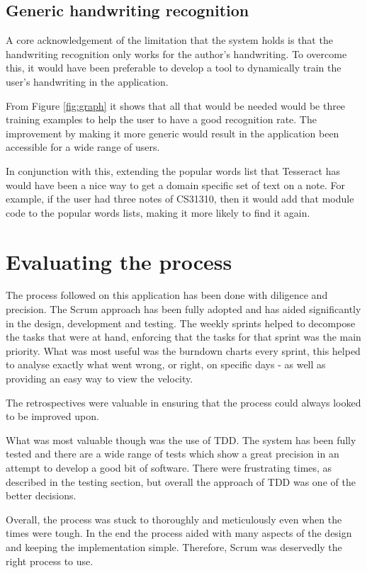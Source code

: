 \subsection{Generic handwriting recognition}
A core acknowledgement of the limitation that the system holds is that the handwriting recognition only works for the author's handwriting. To overcome this, it would have been preferable to develop a tool to dynamically train the user's handwriting in the application.

From Figure \ref{fig:graph} it shows that all that would be needed would be three training examples to help the user to have a good recognition rate. The improvement by making it more generic would result in the application been accessible for a wide range of users.

In conjunction with this, extending the popular words list that Tesseract has would have been a nice way to get a domain specific set of text on a note. For example, if the user had three notes of CS31310, then it would add that module code to the popular words lists, making it more likely to find it again.

\section{Evaluating the process}
The process followed on this application has been done with diligence and precision. The Scrum approach has been fully adopted and has aided significantly in the design, development and testing. The weekly sprints helped to decompose the tasks that were at hand, enforcing that the tasks for that sprint was the main priority. What was most useful was the burndown charts every sprint, this helped to analyse exactly what went wrong, or right, on specific days - as well as providing an easy way to view the velocity.

The retrospectives were valuable in ensuring that the process could always looked to be improved upon.

What was most valuable though was the use of TDD. The system has been fully tested and there are a wide range of tests which show a great precision in an attempt to develop a good bit of software. There were frustrating times, as described in the testing section, but overall the approach of TDD was one of the better decisions.

Overall, the process was stuck to thoroughly and meticulously even when the times were tough. In the end the process aided with many aspects of the design and keeping the implementation simple. Therefore, Scrum was deservedly the right process to use.

